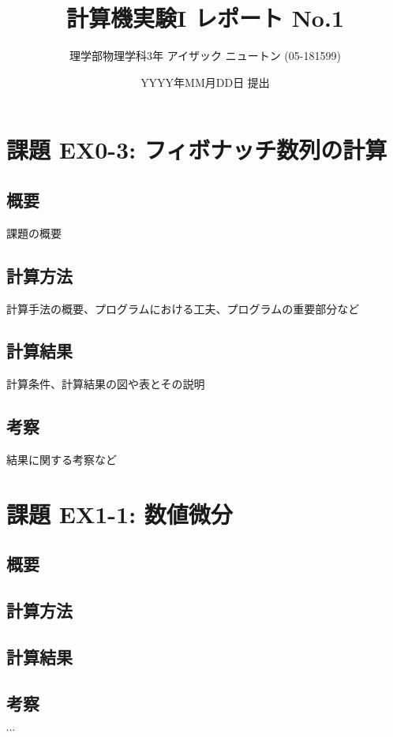 \documentclass[a4j,11pt,dvipdfmx,uplatex]{jsarticle}
\begin{document}
\title{計算機実験I レポート No.1}
\author{理学部物理学科3年 アイザック ニュートン (05-181599)}
\date{YYYY年MM月DD日 提出}

\maketitle

\section{課題 EX0-3: フィボナッチ数列の計算}
\subsection{概要}

課題の概要

\subsection{計算方法}

計算手法の概要、プログラムにおける工夫、プログラムの重要部分など

\subsection{計算結果}

計算条件、計算結果の図や表とその説明

\subsection{考察}

結果に関する考察など

\section{課題 EX1-1: 数値微分}

\subsection{概要}

\subsection{計算方法}

\subsection{計算結果}

\subsection{考察}

\(\cdots\)
\end{document}
